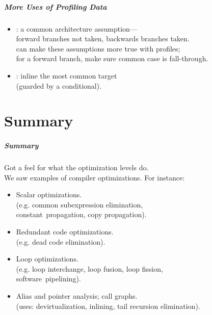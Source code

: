 \documentclass[aspectratio=43]{beamer}
\newenvironment{changemargin}[1]{%
  \begin{list}{}{%
    \setlength{\topsep}{0pt}%
    \setlength{\leftmargin}{#1}%
    \setlength{\rightmargin}{1em}
    \setlength{\listparindent}{\parindent}%
    \setlength{\itemindent}{\parindent}%
    \setlength{\parsep}{\parskip}%
  }%
  \item[]}{\end{list}}
\begin{document}
\begin{frame}
  \frametitle{More Uses of Profiling Data}
  \begin{changemargin}{1cm}

\begin{itemize}
\item {}: a common architecture assumption---\\
\qquad forward branches not taken, backwards branches taken.\\
can make these assumptions more true with profiles;\\
for a forward branch, make sure common case is fall-through.\\[1em]

\item {}: inline the most common target \\ \qquad (guarded by a conditional).
\end{itemize}
  \end{changemargin}

\end{frame}

\part{Summary}
\frame{\partpage}

\begin{frame}
  \frametitle{Summary}

  \begin{changemargin}{1cm}
    Got a feel for what the optimization levels do.\\
    We saw examples of compiler optimizations. For instance:
\begin{itemize}
\item Scalar optimizations. \\
(e.g. common subexpression elimination,\\ \quad constant~propagation, copy propagation).
\item Redundant code optimizations.\\
(e.g. dead code elimination).
\item Loop optimizations.\\
(e.g. loop interchange, loop fusion, loop fission, \\ \quad software~pipelining).
\item Alias and pointer analysis; call graphs.\\
(uses: devirtualization, inlining, tail recursion elimination).
\end{itemize}
  \end{changemargin}


\end{frame}
\end{document}
